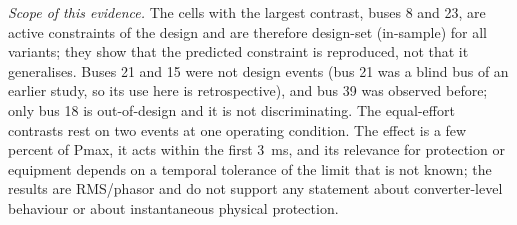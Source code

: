 \emph{Scope of this evidence.} The cells with the largest contrast, buses 8 and 23, are active constraints of the design and are therefore design-set (in-sample) for all variants; they show that the predicted constraint is reproduced, not that it generalises. Buses 21 and 15 were not design events (bus 21 was a blind bus of an earlier study, so its use here is retrospective), and bus 39 was observed before; only bus 18 is out-of-design and it is not discriminating. The equal-effort contrasts rest on two events at one operating condition. The effect is a few percent of Pmax, it acts within the first 3~ms, and its relevance for protection or equipment depends on a temporal tolerance of the limit that is not known; the results are RMS/phasor and do not support any statement about converter-level behaviour or about instantaneous physical protection.
